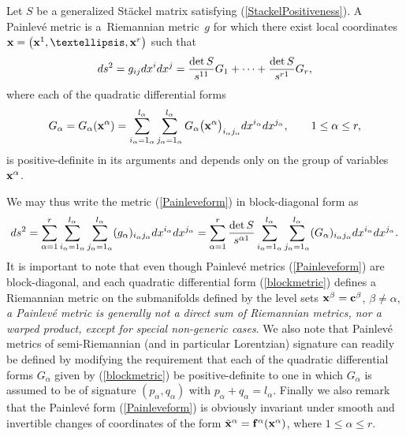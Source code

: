 \documentclass[11pt]{article}
\numberwithin{equation}{section}
\newcommand{\ialpha}{i_{\alpha}}
\newcommand{\jalpha}{j_{\alpha}}
\newcommand{\lalpha}{l_{\alpha}}
\begin{document}
\begin{Definition} \label{Painleve}
Let $S$ be a generalized St\"ackel matrix satisfying (\ref{StackelPositiveness}). A Painlev\'e metric is a~Riemannian metric~$g$ for which there exist local coordinates ${\bf x}=\big({\bf x}^{1},\dots,{\bf x}^{r}\big)$ such that
\begin{gather}\label{Painleveform}
{\rm d}s^{2}=g_{ij}{\rm d}x^{i}{\rm d}x^{j}=\frac{\det S}{s^{11}} G_1 +\cdots+\frac{\det S}{s^{r1}} G_r,
\end{gather}
where each of the quadratic differential forms
\begin{gather}\label{blockmetric}
G_{\alpha}=G_{\alpha}({{\bf x}^{\alpha}})=\sum_{i_{\alpha}=1_{\alpha}}^{l_{\alpha}}\sum_{j_{\alpha}=1_{\alpha}}^{l_{\alpha}}G_{\alpha}\big({{\bf x}^{\alpha}}\big)_{i_{\alpha}j_{\alpha}}{\rm d}x^{i_{\alpha}}{\rm d}x^{j_{\alpha}},\qquad 1\leq \alpha \leq r,
\end{gather}
is positive-definite in its arguments and depends only on the group of variables ${\bf x}^{\alpha}$.
\end{Definition}
We may thus write the metric (\ref{Painleveform}) in block-diagonal form as
\[
{\rm d}s^{2}=\sum_{\alpha =1}^{r}\sum_{\ialpha = 1_{\alpha}}^{\lalpha}\sum_{\jalpha = 1_{\alpha}}^{\lalpha}(g_{\alpha})_{\ialpha \jalpha}{\rm d}x^{\ialpha}{\rm d}x^{\jalpha}=\sum_{\alpha =1}^{r} \frac{\det S}{s^{\alpha 1}} \sum_{\ialpha = 1_{\alpha}}^{\lalpha}\sum_{\jalpha = 1_{\alpha}}^{\lalpha}(G_{\alpha})_{i_{\alpha}j_{\alpha}}{\rm d}x^{i_{\alpha}}{\rm d}x^{j_{\alpha}}.
\]
It is important to note that even though Painlev\'e metrics (\ref{Painleveform}) are block-diagonal, and each quadratic differential form (\ref{blockmetric}) defines a Riemannian metric on the submanifolds defined by the level sets ${\bf x}^{\beta}={\bf{c}}^{\beta}$, $\beta\neq \alpha$, {\emph {a Painlev\'e metric is generally not a direct sum of Riemannian metrics, nor a warped product, except for special non-generic cases}}. We also note that Painlev\'e metrics of semi-Riemannian (and in particular Lorentzian) signature can readily be defined by modifying the requirement that each of the quadratic differential forms $G_{\alpha}$ given by (\ref{blockmetric}) be positive-definite to one in which $G_{{\alpha}}$ is assumed to be of signature $(p_{\alpha},q_{\alpha})$ with $p_{\alpha}+q_{\alpha}=l_{\alpha}$. Finally we also remark that the Painlev\'e form (\ref{Painleveform}) is obviously invariant under smooth and invertible changes of coordinates of the form ${\tilde{\bf x}}^{\alpha}={\bf{f}}^{\alpha}({\bf x}^{\alpha})$, where $1\leq \alpha \leq r$.
\end{document}
